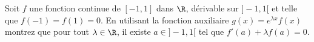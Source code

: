 
\begin{exercice}\label{exo0096}

Soit $f$ une fonction continue de $[-1,1]$ dans $\R$, dérivable sur $]- 1,1[$ et telle que $f(-1)=f(1)=0$. En utilisant la fonction auxiliaire $g(x) = e^{\lambda x}f(x)$ montrez que pour tout $\lambda \in \R$, il existe $a \in ]-1,1[$ tel que $f'(a) + \lambda f(a) = 0$.

\end{exercice}
